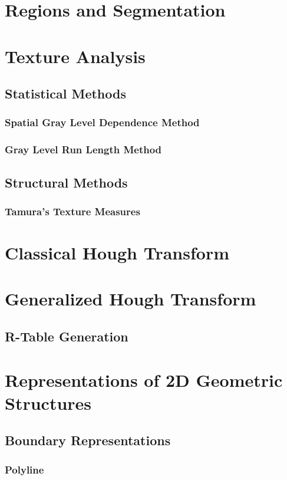 \documentclass{article}
\begin{document}
\section{Regions and Segmentation}

\section{Texture Analysis}
\subsection{Statistical Methods}
\subsubsection{Spatial Gray Level Dependence Method}
\subsubsection{Gray Level Run Length Method}
\subsection{Structural Methods}
\subsubsection{Tamura's Texture Measures}

\section{Classical Hough Transform}

\section{Generalized Hough Transform}
\subsection{R-Table Generation}

\section{Representations of 2D Geometric Structures}
\subsection{Boundary Representations}
\subsubsection{Polyline}
\end{document}

